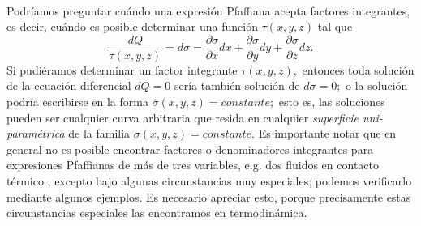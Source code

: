 \documentclass{article}
\theoremstyle{definition} \newtheorem{defi}{Definici\'on}
\theoremstyle{definition} \newtheorem{teo}{Teorema}
\theoremstyle{definition} \newtheorem{cor}{Corolario}
\begin{document}
\paragraph{}
Podr\'iamos preguntar cu\'ando una expresi\'on Pfaffiana acepta factores integrantes, es decir, cu\'ando es posible determinar una funci\'on $\tau(x, y, z)$ tal que
\begin{equation}\label{integrante}
\frac{dQ}{\tau(x, y, z)} = d\sigma = \frac{\partial{\sigma}}{\partial{x}}dx + \frac{\partial{\sigma}}{\partial{y}}dy + \frac{\partial{\sigma}}{\partial{z}}dz.
\end{equation}
Si pudi\'eramos determinar un factor integrante $\tau(x, y, z),$ entonces toda soluci\'on de la ecuaci\'on diferencial $dQ =0$ ser\'ia tambi\'en soluci\'on de $d\sigma = 0;$ o la soluci\'on podr\'ia escribirse en la forma $\sigma(x, y, z) = constante;$ esto es, las soluciones pueden ser cualquier curva arbitraria que resida en cualquier \emph{superficie uni-param\'etrica} de la familia $\sigma(x, y, z) = constante.$ Es importante notar que en general no es posible encontrar factores o denominadores integrantes para expresiones Pfaffianas de m\'as de tres variables, e.g. dos fluidos en contacto t\'ermico \cite{MB}, excepto bajo algunas circunstancias muy especiales; podemos verificarlo mediante algunos ejemplos. Es necesario apreciar esto, porque precisamente estas circunstancias especiales las encontramos en termodin\'amica.
\end{document}
